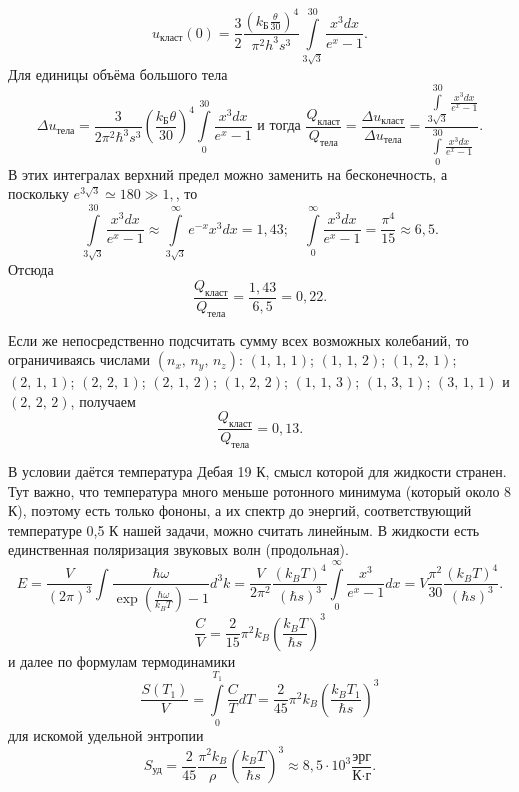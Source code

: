 \documentclass[a4paper]{article}
\begin{document}
\begin{sol}
\[u_\text{класт}(0)= \frac{3}{2} \frac{
\left( k_\text{Б}\frac{\theta}{30} \right)^4 }{
\pi^2 h^3 s^3} \int\limits_{3 \sqrt{3} }^{30} 
\frac{x^3 dx}{e^x-1}
.\] 
Для единицы объёма большого тела
\[
\Delta u_\text{тела}= \frac{3}{2\pi^2 \hbar ^3 s^3}
\left( \frac{k_\text{Б} \theta}{30} \right) ^4
\int\limits_{0}^{30} \frac{x^3 dx}{e^x -1} \text{ и
 тогда }  \frac{Q_\text{класт}}{Q_\text{тела}}=
\frac{\Delta u_{\text{класт}}}{\Delta u_\text{тела}}=
\frac{\int\limits_{3 \sqrt{3} }^{30}  \frac{x^3 dx}{e^x-1}}{\int\limits_{0}^{30} \frac{x^3 dx}{e^x -1} }
.\] 
В этих интегралах верхний предел можно
заменить на бесконечность, а поскольку
$
e^{3\sqrt{3} }\simeq 180 \gg 1, 
$, то
\[
\int\limits_{3\sqrt{3} }^{30} \frac{x^3 dx}{e^x -1}
\approx \int\limits_{3\sqrt{3} }^{\infty} e^{-x}
x^3 dx =1,43;\quad
\int\limits_{0}^{\infty} \frac{x^3 dx}{e^x-1}=
\frac{\pi^4}{15} \approx 6,5
.\] 
Отсюда \[
\frac{Q_\text{класт}}{Q_\text{тела}}=\frac{1,43}{
6,5}=0,22
.\] 

Если же непосредственно подсчитать сумму всех
возможных колебаний, то ограничиваясь числами
$(n_x,\,n_y,\,n_z)$: $(1,\,1,\,1)$; $(1,\,1,\,2)$;
$(1,\,2,\,1)$; $(2,\,1,\,1)$; $(2,\,2,\,1)$;
$(2,\,1,\,2)$; $(1,\,2,\,2)$; $(1,\,1,\,3)$;
$(1,\,3,\,1)$; $(3,\,1,\,1)$ и $(2,\,2,\,2)$,
получаем
\[
\frac{Q_\text{класт}}{Q_\text{тела}}=0,13
.\] 
\end{sol}
\begin{hiProb}[2.58]
\end{hiProb}
\begin{sol}
В условии даётся температура Дебая 19 К, смысл которой
для жидкости странен. Тут важно, что температура много
меньше ротонного минимума (который около 8 К),
поэтому есть только фононы, а их спектр до энергий,
соответствующий температуре
0,5 К нашей задачи, можно считать линейным.
В жидкости есть единственная поляризация
звуковых волн (продольная).
\[
	E= \frac{V}{(2\pi)^3} \int
	\frac{\hbar \omega}{\exp \left( \frac{\hbar \omega}{k_B T} \right) -1}d^3k= \frac{V}{2\pi^2}
	\frac{(k_B T)^4}{(\hbar s)^3} \int\limits_{0}^{\infty}  \frac{x^3}{e^x -1}dx=
	V \frac{\pi^2}{30} \frac{(k_B T)^4}{(\hbar 
	s)^3}
.\] 
\[
	\frac{C}{V}= \frac{2}{15} \pi^2 k_B \left( 
	\frac{k_B T}{\hbar s}\right) ^3
\] 
и далее по формулам термодинамики
\[
	\frac{S(T_1)}{V}= \int\limits_{0}^{T_1} 
	\frac{C}{T} dT= \frac{2}{45}
	\pi^2 k_B \left( \frac{k_B T_1}{\hbar  s} \right) ^3
\]
для искомой удельной энтропии
\[
S_\text{уд} = \frac{2}{45}\frac{\pi^2 k_B}{\rho}
\left( \frac{k_B T}{\hbar s} \right) ^3 \approx
8,5 \cdot 10^3 \frac{\text{эрг}}{\text{К}\cdot
\text{г}}
.\] 
\end{sol}
\end{document}
